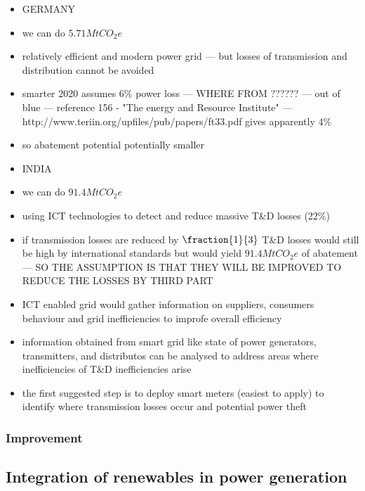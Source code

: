 \documentclass[11pt, twocolumn]{article}
\begin{document}
\begin{itemize}
\item GERMANY
\item we can do $5.71 Mt CO_2e$
\item relatively efficient and modern power grid --- but losses of transmission and distribution cannot be avoided
\item smarter 2020 assumes 6\% power loss --- WHERE FROM ?????? --- out of blue --- reference 156 - "The energy and Resource Institute" --- http://www.teriin.org/upfiles/pub/papers/ft33.pdf gives apparently 4\%
\item so abatement potential potentially smaller

\item INDIA
\item we can do $91.4 Mt CO_2e$
\item using ICT technologies to detect and reduce massive T\&D losses (22\%)
\item if transmission losses are reduced by $\fraction{1}{3}$ T\&D losses would still be high by international standards but would yield $91.4 MtCO_2e$ of abatement --- SO THE ASSUMPTION IS THAT THEY WILL BE IMPROVED TO REDUCE THE LOSSES BY THIRD PART
\item ICT enabled grid would gather information on suppliers, consumers behaviour and grid inefficiencies to improfe overall efficiency
\item information obtained from smart grid like state of power generators, transmitters, and distributos can be analysed to address areas where inefficiencies of T\&D inefficiencies arise
\item the first suggested step is to deploy smart meters (easiest to apply) to identify where transmission losses occur and potential power theft

\end{itemize}
\subsubsection{Improvement}

\subsection{Integration of renewables in power generation}
\end{document}
